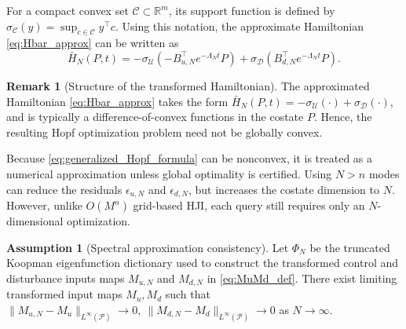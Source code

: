 \documentclass[letterpaper, 10 pt, conference]{ieeeconf}
\theoremstyle{plain}
\theoremstyle{definition}
\newtheorem{assumption}{Assumption}
\newtheorem{remark}{\textbf{Remark}}
\begin{document}
For a compact convex set $\mathcal C \subset \mathbb R^m$, its support function is defined by $\sigma_{\mathcal C}(y) = \sup_{c\in\mathcal C} y^\top c$.
Using this notation, the approximate Hamiltonian
\eqref{eq:Hbar_approx} can be written as
\begin{equation*}
    \bar H_N(P,t)
    =
    -
    \sigma_{\mathcal U}
    \!\left(
    -B_{u,N}^\top e^{-\Lambda_N t}P
    \right)
    +
    \sigma_{\mathcal D}
    \!\left(
    B_{d,N}^\top e^{-\Lambda_N t}P
    \right).
\end{equation*}


\begin{remark}[Structure of the transformed Hamiltonian]
    The approximated Hamiltonian \eqref{eq:Hbar_approx} takes the form
    \(\bar H_N(P,t) = - \sigma_{\mathcal U}(\cdot) + \sigma_{\mathcal D}(\cdot)\), and is typically a difference-of-convex functions in the costate $P$.
    Hence, the resulting Hopf optimization problem need not be globally convex.
\end{remark}

Because \eqref{eq:generalized_Hopf_formula} can be nonconvex, it is treated as a numerical approximation unless global optimality is certified.
Using $N>n$ modes can reduce the residuals $\epsilon_{u,N}$ and $\epsilon_{d,N}$, but increases the costate dimension to $N$. 
However, unlike $O(M^n)$ grid-based HJI, each query still requires only an $N$-dimensional optimization. 


\begin{assumption}[Spectral approximation consistency]
    Let $\Phi_N$ be the truncated Koopman eigenfunction dictionary used to construct the transformed control and disturbance inputs maps $M_{u,N}$ and $M_{d,N}$ in \eqref{eq:MuMd_def}. 
    There exist limiting transformed input maps $M_u,M_d$ such that \( \|M_{u,N}-M_u\|_{L^\infty(\mathcal P)}\to 0, \ \|M_{d,N}-M_d\|_{L^\infty(\mathcal P)}\to 0 \)
    as $N\to\infty$.
\end{assumption}
\end{document}
